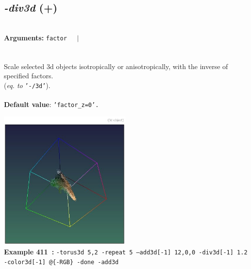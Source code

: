 \documentclass[a4paper,11pt,twoside]{book}
\begin{document}
\subsection{\emph{-div3d} (+)}\vspace*{-0.5em}
~\\\textbf{Arguments: } 
{\small \texttt{factor}}~~~$|$\\
\\~\\
Scale selected 3d objects isotropically or anisotropically, with the inverse of specified
factors.
~\\(\emph{eq. to} {\small \texttt{'-/3d'}}).
~\\~\\\textbf{Default value}: {\small \texttt{'factor\_z=0'.}}
\begin{center}\includegraphics[keepaspectratio=true,height=7cm,width=\textwidth]{img/gmic_def411.jpg}\\
{\footnotesize \textbf{Example 411~:} \texttt{-torus3d 5,2 -repeat 5 --add3d[-1] 12,0,0 -div3d[-1] 1.2 -color3d[-1] @\{-RGB\} -done -add3d}}
\end{center}
\end{document}
